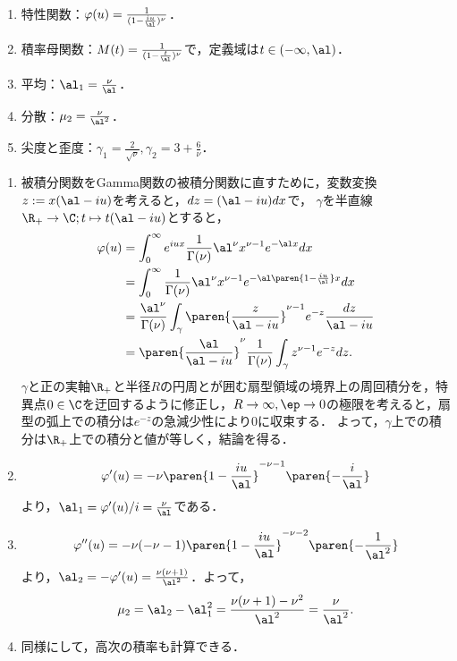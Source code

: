 \documentclass[uplatex,dvipdfmx]{jsarticle}
\begin{document}
\begin{proposition}[Gamma分布の性質]\mbox{}\label{prop-property-of-Gamma-distribution}
    \begin{enumerate}
        \item 特性関数：$\varphi(u)=\frac{1}{(1-\frac{iu}{\al})^\nu}$．
        \item 積率母関数：$M(t)=\frac{1}{(1-\frac{t}{\al})^\nu}$で，定義域は$t\in(-\infty,\al)$．
        \item 平均：$\al_1=\frac{\nu}{\al}$．
        \item 分散：$\mu_2=\frac{\nu}{\al^2}$．
        \item 尖度と歪度：$\gamma_1=\frac{2}{\sqrt{\nu}},\gamma_2=3+\frac{6}{\nu}$．
    \end{enumerate}
\end{proposition}
\begin{Proof}\mbox{}
    \begin{enumerate}
        \item 被積分関数をGamma関数の被積分関数に直すために，変数変換$z:=x(\al-iu)$を考えると，$dz=(\al-iu)dx$で，
        $\gamma$を半直線$\R_+\to\C;t\mapsto t(\al-iu)$とすると，
        \begin{align*}
            \varphi(u)&=\int^\infty_0e^{iux}\frac{1}{\Gamma(\nu)}\al^\nu x^{\nu-1}e^{-\al x}dx\\
            &=\int^\infty_0\frac{1}{\Gamma(\nu)}\al^\nu x^{\nu-1}e^{-\al\paren{1-\frac{iu}{\al}}x}dx\\
            &=\frac{\al^\nu}{\Gamma(\nu)}\int_{\gamma}\paren{\frac{z}{\al-iu}}^{\nu-1}e^{-z}\frac{dz}{\al-iu}\\
            &=\paren{\frac{\al}{\al-iu}}^\nu\frac{1}{\Gamma(\nu)}\int_\gamma z^{\nu-1}e^{-z}dz.
        \end{align*}
        $\gamma$と正の実軸$\R_+$と半径$R$の円周とが囲む扇型領域の境界上の周回積分を，特異点$0\in\C$を迂回するように修正し，$R\to\infty,\ep\to0$の極限を考えると，扇型の弧上での積分は$e^{-z}$の急減少性により$0$に収束する．
        よって，$\gamma$上での積分は$\R_+$上での積分と値が等しく，結論を得る．
        \item \[\varphi'(u)=-\nu\paren{1-\frac{iu}{\al}}^{-\nu-1}\paren{-\frac{i}{\al}}\]
        より，$\al_1=\varphi'(u)/i=\frac{\nu}{\al}$である．
        \item \[\varphi''(u)=-\nu(-\nu-1)\paren{1-\frac{iu}{\al}}^{-\nu-2}\paren{-\frac{1}{\al^2}}\]
        より，$\al_2=-\varphi'(u)=\frac{\nu(\nu+1)}{\al^2}$．よって，
        \[\mu_2=\al_2-\al_1^2=\frac{\nu(\nu+1)-\nu^2}{\al^2}=\frac{\nu}{\al^2}.\]
        \item 同様にして，高次の積率も計算できる．
    \end{enumerate}
\end{Proof}
\end{document}
